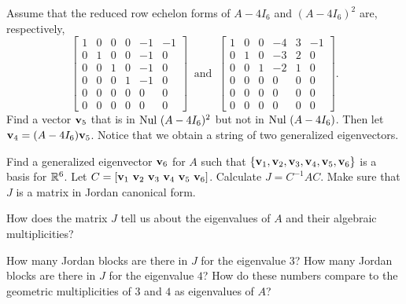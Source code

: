 \begin{activity}
\item Assume that the reduced row echelon forms of $A -4 I_6$ and $(A-4I_6)^2$ are, respectively,  
\[  \left[ \begin{array}{ccccrr} 1&0&0&0&-1&-1\\ 0&1&0&0&-1&0\\ 0&0&1&0&-1&0\\ 0&0&0&1&-1&0 \\ 0&0&0&0&0&0 \\ 0&0&0&0&0&0 \end{array} \right] \  \text{ and } \ \left[ \begin{array}{cccrcr} 1&0&0&-4&3&-1\\ 0&1&0&-3&2&0 \\ 0&0&1&-2&1&0\\ 0&0&0&0&0&0\\ 0&0&0&0&0&0\\ 0&0&0&0&0&0 \end{array} \right]. \]
Find a vector $\mathbf{v}_5$ that is in $\text{Nul } (A-4I_6)^2$ but not in $\text{Nul } (A-4I_6)$. Then let $\mathbf{v}_4 = (A-4I_6)\mathbf{v}_5$. Notice that we obtain a string of two generalized eigenvectors. 

\item Find a generalized eigenvector $\mathbf{v}_6$ for $A$ such that $\{\mathbf{v}_1, \mathbf{v}_2, \mathbf{v}_3, \mathbf{v}_4, \mathbf{v}_5, \mathbf{v}_6\}$ is a basis for $\mathbb{R}^6$. Let $C = [\mathbf{v}_1 \ \mathbf{v}_2 \ \mathbf{v}_3 \ \mathbf{v}_4 \ \mathbf{v}_5 \ \mathbf{v}_6]$. Calculate $J=C^{-1}AC$. Make sure that $J$ is a matrix in Jordan canonical form. 

\item How does the matrix $J$ tell us about the eigenvalues of $A$ and their algebraic multiplicities? 

\item How many Jordan blocks are there in $J$ for the eigenvalue $3$? How many Jordan blocks are there in $J$ for the eigenvalue $4$? How do these numbers compare to the geometric multiplicities of $3$ and $4$ as eigenvalues of $A$?

\ea

\end{activity}

